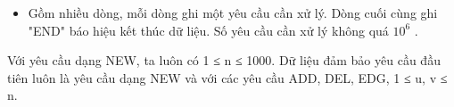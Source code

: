 \begin{itemize}
	\item     Gồm nhiều dòng, mỗi dòng ghi một yêu cầu cần xử lý. Dòng cuối cùng ghi "END" báo hiệu kết thúc dữ liệu. Số yêu cầu cần xử lý không quá $10^{6}$    .   
\end{itemize}

   Với yêu cầu dạng NEW, ta luôn có 1 ≤ n ≤ 1000. Dữ liệu đảm bảo yêu cầu đầu tiên luôn là yêu cầu dạng NEW và với các yêu cầu ADD, DEL, EDG, 1 ≤ u, v ≤ n.